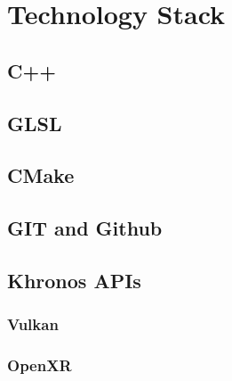 \newpage
\section{Technology Stack} %
\subsection{C++}
\subsection{GLSL}
\subsection{CMake}
\label{sec:stack_cmake}
\subsection{GIT and Github}
\subsection{Khronos APIs}
\label{sec:khronos}
\label{sec:glsl}
\subsubsection{Vulkan}
\label{sec:stack_vk}
\subsubsection{OpenXR}
\label{sec:stack_xr}